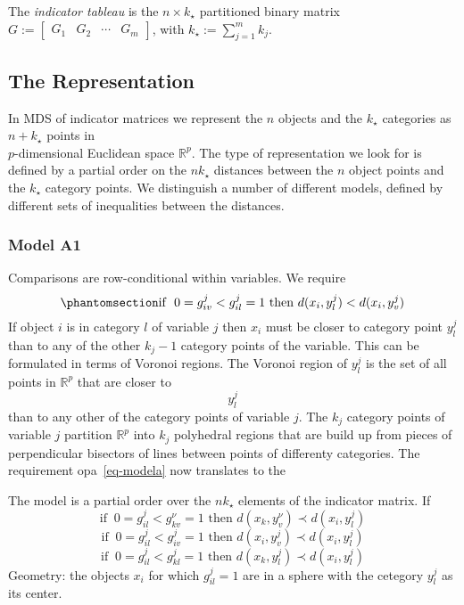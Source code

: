 \documentclass[
  12pt,
  letterpaper,
  DIV=11,
  numbers=noendperiod]{scrartcl}
\begin{document}
The \emph{indicator tableau} is the \(n\times k_\star\) partitioned
binary matrix \(G:=\begin{bmatrix}G_1&G_2&\cdots& G_m\end{bmatrix}\),
with \(k_\star:=\sum_{j=1}^m k_j\).

\subsection{The Representation}\label{the-representation}

In MDS of indicator matrices we represent the \(n\) objects and the
\(k_\star\) categories as \(n+k_\star\) points in\\
\(p\)-dimensional Euclidean space \(\mathbb{R}^p\). The type of
representation we look for is defined by a partial order on the
\(nk_\star\) distances between the \(n\) object points and the
\(k_\star\) category points. We distinguish a number of different
models, defined by different sets of inequalities between the distances.

\subsubsection{Model A1}\label{model-a1}

Comparisons are row-conditional within variables. We require
\begin{equation}\phantomsection\label{eq-modela}{
\text{if }\ 0=g^j_{iv}<g^j_{il}=1\text{ then }d(x_i,y^j_l)<d(x_i,y^j_v)
}\end{equation} If object \(i\) is in category \(l\) of variable \(j\)
then \(x_i\) must be closer to category point \(y^j_l\) than to any of
the other \(k_j-1\) category points of the variable. This can be
formulated in terms of Voronoi regions. The Voronoi region of \(y^j_l\)
is the set of all points in \(\mathbb{R}^p\) that are closer to
\[y^j_l\] than to any other of the category points of variable \(j\).
The \(k_j\) category points of variable \(j\) partition \(\mathbb{R}^p\)
into \(k_j\) polyhedral regions that are build up from pieces of
perpendicular bisectors of lines between points of differenty
categories. The requirement opa~\ref{eq-modela} now translates to the

The model is a partial order over the \(nk_\star\) elements of the
indicator matrix. If \[
\text{if }\ 0=g^j_{il}<g^\nu_{kv}=1\text{ then }d(x_k,y^\nu_v)\prec d(x_i,y^j_l)
\] \[
\text{if }\ 0=g^j_{il}<g^j_{iv}=1\text{ then }d(x_i,y^j_v)\prec d(x_i,y^j_l)
\] \[
\text{if }\ 0=g^j_{il}<g^j_{kl}=1\text{ then }d(x_k,y^j_l)\prec d(x_i,y^j_l)
\] Geometry: the objects \(x_i\) for which \(g^j_{il}=1\) are in a
sphere with the cetegory \(y^j_l\) as its center.
\end{document}
